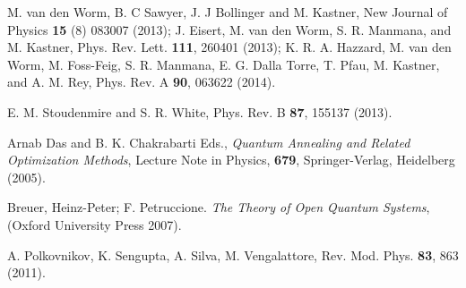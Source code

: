 \documentclass[a4paper,11pt,color]{article}
\renewenvironment{thebibliography}[1]{%
    \begin{oldthebibliography}{#1}%
      \setlength{\parskip}{0ex}%
      \setlength{\itemsep}{0ex}%
  }%
  {%
    \end{oldthebibliography}%
  }
\begin{document}
\begin{thebibliography}{}
M. van den Worm, B. C Sawyer, J. J Bollinger and M. Kastner, New Journal of Physics {\bf 15} (8) 083007 (2013); J. Eisert, M. van den Worm, S. R. Manmana, and M. Kastner, Phys. Rev. Lett. {\bf 111}, 260401 (2013); K. R. A. Hazzard, M. van den Worm, M. Foss-Feig, S. R. Manmana, E. G. Dalla Torre, T. Pfau, M. Kastner, and A. M. Rey, Phys. Rev. A {\bf 90}, 063622 (2014).

E. M. Stoudenmire and S. R. White, Phys. Rev. B {\bf 87}, 155137 (2013).

Arnab Das and B. K. Chakrabarti Eds., \textit{Quantum Annealing and Related Optimization Methods}, Lecture Note in Physics, {\bf 679}, Springer-Verlag, Heidelberg (2005).

Breuer, Heinz-Peter; F. Petruccione. \textit{The Theory of Open Quantum Systems}, (Oxford University Press 2007).

A. Polkovnikov, K. Sengupta, A. Silva, M. Vengalattore, Rev. Mod. Phys. \textbf{83}, 863 (2011).


\end{thebibliography}
\end{document}
